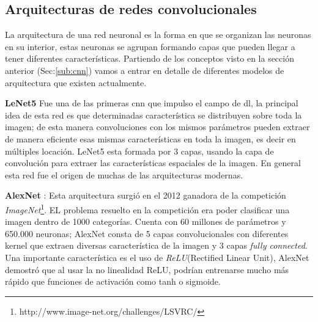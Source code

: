 



\subsection{Arquitecturas de redes convolucionales}\label{sub:arquitecturacnn}
La arquitectura de una red neuronal es la forma en que se organizan  las neuronas en su interior, estas neuronas se agrupan formando capas que pueden llegar a tener diferentes características. Partiendo de los conceptos visto en la sección anterior (Sec:\ref{sub:cnn}) vamos a entrar en detalle de diferentes modelos de arquitectura que existen actualmente.

\par \textbf{LeNet5} \citep{lenet} Fue una de las primeras \ac{cnn} que impulso el campo de \ac{dl}, la principal idea de esta red es que determinadas característica se distribuyen sobre toda la imagen; de esta manera convoluciones con los mismos parámetros pueden extraer de manera eficiente esas mismas características en toda la imagen, es decir en múltiples locación. LeNet5 esta formada por 3 capas, usando la capa de convolución para extraer las características espaciales de la imagen. En general esta red fue el origen de muchas de las arquitecturas modernas.

\par \textbf{AlexNet} \citep{alexnet}: Esta arquitectura surgió en el 2012 ganadora de la competición \textit{ImageNet}\footnote{http://www.image-net.org/challenges/LSVRC/}. EL problema resuelto en la competición era poder clasificar una imagen dentro de 1000 categorías. Cuenta con 60 millones de parámetros y 650.000 neuronas; AlexNet consta de 5 capas convolucionales con diferentes kernel que extraen diversas característica de la imagen  y 3 capas \textit{fully connected}. Una importante característica es el uso de \textit{ReLU}(Rectified Linear Unit),  AlexNet demostró que al usar la no linealidad ReLU,  podrían entrenarse mucho más rápido que  funciones de activación como  tanh o sigmoide.

